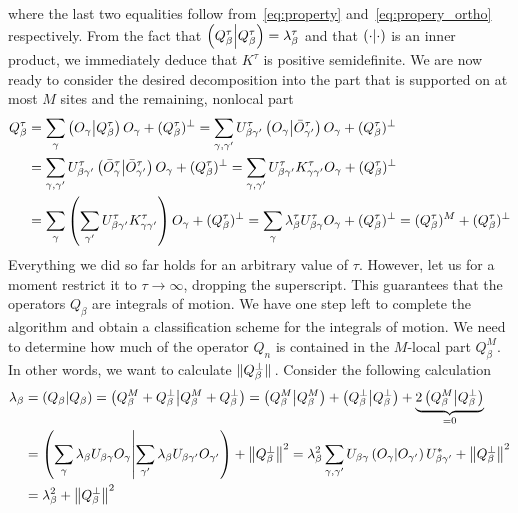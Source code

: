 where the last two equalities follow from~\eqref{eq:property} and~\eqref{eq:propery_ortho} respectively.
From the fact that \(\left(Q^{\tau}_{\beta} \middle| Q^{\tau}_{\beta}\right) = \lambda^{\tau}_{\beta}\) and that \(\left(\cdot \middle| \cdot\right)\) is an inner product,
we immediately deduce that \(K^{\tau}\) is positive semidefinite.
We are now ready to consider the desired decomposition into the part that is supported on at most \(M\) sites and the remaining, nonlocal part
\begin{align}
    Q^{\tau}_{\beta} &=  \sum_{\gamma} \left(O_{\gamma} \middle| Q^{\tau}_{\beta}\right)O_{\gamma} + (Q^{\tau}_{\beta})^{\perp} = \sum_{\gamma,\gamma^{\prime}} U^{\tau}_{\beta \gamma^{\prime}}\left(O_{\gamma} \middle| \bar{O}_{\gamma^{\prime}}^{\tau}\right)
    O_{\gamma}+(Q^{\tau}_{\beta})^{\perp} \nonumber \\
    &= \sum_{\gamma,\gamma^{\prime}} U^{\tau}_{\beta\gamma^{\prime}}\left(\bar{O}_{\gamma}^{\tau} \middle| \bar{O}_{\gamma^{\prime}}^{\tau}\right) O_{\gamma}+(Q^{\tau}_{\beta})^{\perp}
    = \sum_{\gamma,\gamma^{\prime}} U^{\tau}_{\beta\gamma^{\prime}}K^{\tau}_{\gamma\gamma^{\prime}} O_{\gamma}+(Q^{\tau}_{\beta})^{\perp} \nonumber \\
    &= \sum_{\gamma}  \left( \sum_{\gamma^{\prime}} U^{\tau}_{\beta\gamma^{\prime}}K_{\gamma\gamma^{\prime}}^{\tau}\right) O_{\gamma}+(Q^{\tau}_{\beta})^{\perp} = \sum_{\gamma} 
    \lambda^{\tau}_{\beta} U^{\tau}_{\beta \gamma} O_{\gamma}+(Q^{\tau}_{\beta})^{\perp} = (Q^{\tau}_{\beta})^{M}+(Q^{\tau}_{\beta})^{\perp}
    \label{eq:decomposition2}
  \end{align}
  Everything we did so far holds for an
arbitrary value of \(\tau\). However, let us for a moment restrict it to \(\tau\to \infty\), dropping the superscript.
This guarantees that the operators \(Q_{\beta}\) are integrals of motion.
  We have one step left to complete the algorithm and obtain a classification scheme for the
  integrals of motion. We need to determine how much of the operator \(Q_n\) is contained in the
  \(M\)-local part \(Q_{\beta}^M\). In other words, we want to calculate \(\norm*{Q_{\beta}^{\perp}}\).
  Consider the following calculation
  \begin{align}
    \lambda_{\beta} &= \left(Q_{\beta} \middle| Q_{\beta}\right) = \left(Q_{\beta}^M + Q_{\beta}^{\perp} \middle| Q_{\beta}^M + Q_{\beta}^{\perp}\right) = \left(Q_{\beta}^M \middle| Q_{\beta}^M\right) +
     \left(Q_{\beta}^{\perp} \middle| Q_{\beta}^{\perp}\right) + \underbrace{2 \left(Q_{\beta}^M \middle| Q_{\beta}^{\perp}\right)}_{=0} \nonumber \\
     &= \left(\sum_{\gamma} \lambda_{\beta} U_{\beta\gamma} O_{\gamma} \middle| \sum_{\gamma^{\prime}} \lambda_{\beta} U_{\beta\gamma^{\prime}} O_{\gamma^{\prime}}\right) + \norm{Q_{\beta}^{\perp}}^2 =
    \lambda_{\beta}^2 \sum_{\gamma,\gamma^{\prime}} U_{\beta\gamma} \left(O_{\gamma} \middle| O_{\gamma^{\prime}}\right) U_{\beta\gamma^{\prime}}^{\ast} + \norm{Q_{\beta}^{\perp}}^2  \nonumber \\
    &=\lambda_{\beta}^2 + \norm{Q_{\beta}^{\perp}}^2
  \end{align}
